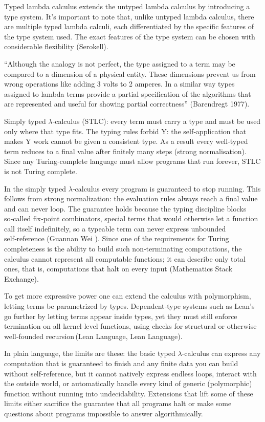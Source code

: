 \documentclass{article}
\newcommand{\1}{\mathbbm{1}}
\theoremstyle{plain}
\theoremstyle{definition}
\numberwithin{equation}{section}
\begin{document}
Typed lambda calculus extends the untyped lambda calculus by introducing a type system. It’s important to note that, unlike untyped lambda calculus, there are multiple typed lambda calculi, each differentiated by the specific features of the type system used. The exact features of the type system can be chosen with considerable flexibility (Serokell).  

“Although the analogy is not perfect, the type assigned to a term may be compared to a dimension of a physical entity. These dimensions prevent us from wrong operations like adding 3 volts to 2 amperes. In a similar way types assigned to lambda terms provide a partial specification of the algorithms that are represented and useful for showing partial correctness” (Barendregt 1977). 

Simply typed $\lambda$‑calculus (STLC): every term must carry a type and must be used only where that type fits. The typing rules forbid Y: the self‑application that makes Y work cannot be given a consistent type. As a result every well‑typed term reduces to a final value after finitely many steps (strong normalisation). Since any Turing‑complete language must allow programs that run forever, STLC is not Turing complete.

In the simply typed $\lambda$‑calculus every program is guaranteed to stop running. This follows from strong normalization: the evaluation rules always reach a final value and can never loop. The guarantee holds because the typing discipline blocks so‑called fix‑point combinators, special terms that would otherwise let a function call itself indefinitely, so a typeable term can never express unbounded self‑reference (Guannan Wei ). Since one of the requirements for Turing completeness is the ability to build such non‑terminating computations, the calculus cannot represent all computable functions; it can describe only total ones, that is, computations that halt on every input (Mathematics Stack Exchange).

To get more expressive power one can extend the calculus with polymorphism, letting terms be parametrized by types. Dependent‑type systems such as Lean’s go further by letting terms appear inside types, yet they must still enforce termination on all kernel‑level functions, using checks for structural or otherwise well‑founded recursion (Lean Language, Lean Language).

In plain language, the limits are these: the basic typed $\lambda$‑calculus can express any computation that is guaranteed to finish and any finite data you can build without self‑reference, but it cannot natively express endless loops, interact with the outside world, or automatically handle every kind of generic (polymorphic) function without running into undecidability. Extensions that lift some of these limits either sacrifice the guarantee that all programs halt or make some questions about programs impossible to answer algorithmically.
\end{document}
